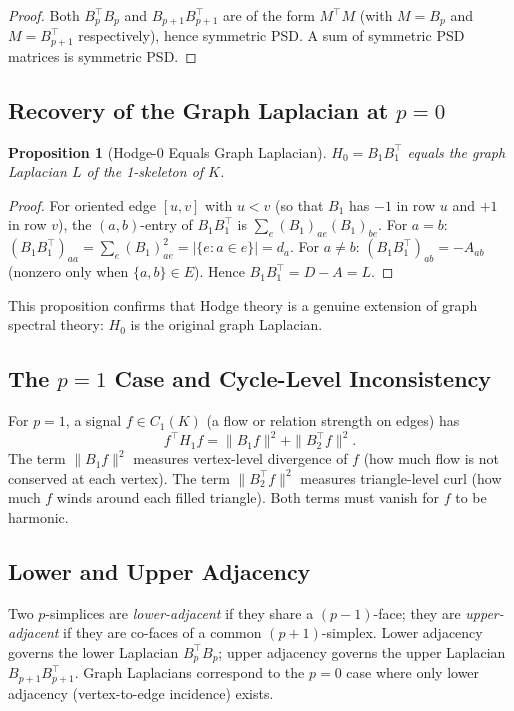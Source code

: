 \documentclass[11pt]{article}
\newtheorem{proposition}[theorem]{Proposition}
\theoremstyle{definition}
\theoremstyle{remark}
\begin{document}
\begin{proof}
Both $B_p^\top B_p$ and $B_{p+1}B_{p+1}^\top$ are of the form $M^\top M$
(with $M=B_p$ and $M=B_{p+1}^\top$ respectively), hence symmetric PSD. A sum
of symmetric PSD matrices is symmetric PSD.
\end{proof}

\subsection{Recovery of the Graph Laplacian at $p=0$}

\begin{proposition}[Hodge-0 Equals Graph Laplacian]
\label{prop:h0}
$H_0 = B_1 B_1^\top$ equals the graph Laplacian $L$ of the 1-skeleton of $K$.
\end{proposition}

\begin{proof}
For oriented edge $[u,v]$ with $u<v$ (so that $B_1$ has $-1$ in row $u$ and
$+1$ in row $v$), the $(a,b)$-entry of $B_1 B_1^\top$ is
$\sum_e (B_1)_{ae}(B_1)_{be}$. For $a=b$: $(B_1 B_1^\top)_{aa} = \sum_e
(B_1)_{ae}^2 = |\{e : a \in e\}| = d_a$. For $a\neq b$: $(B_1B_1^\top)_{ab}
= -A_{ab}$ (nonzero only when $\{a,b\}\in E$). Hence $B_1B_1^\top = D-A = L$.
\end{proof}

This proposition confirms that Hodge theory is a genuine extension of graph
spectral theory: $H_0$ is the original graph Laplacian.

\subsection{The $p=1$ Case and Cycle-Level Inconsistency}

For $p=1$, a signal $f\in C_1(K)$ (a flow or relation strength on edges) has
\[
  f^\top H_1 f = \|B_1 f\|^2 + \|B_2^\top f\|^2.
\]
The term $\|B_1 f\|^2$ measures vertex-level divergence of $f$ (how much flow
is not conserved at each vertex). The term $\|B_2^\top f\|^2$ measures
triangle-level curl (how much $f$ winds around each filled triangle). Both
terms must vanish for $f$ to be harmonic.

\subsection{Lower and Upper Adjacency}

Two $p$-simplices are \emph{lower-adjacent} if they share a $(p-1)$-face; they
are \emph{upper-adjacent} if they are co-faces of a common $(p+1)$-simplex.
Lower adjacency governs the lower Laplacian $B_p^\top B_p$; upper adjacency
governs the upper Laplacian $B_{p+1}B_{p+1}^\top$. Graph Laplacians correspond
to the $p=0$ case where only lower adjacency (vertex-to-edge incidence) exists.
\end{document}
